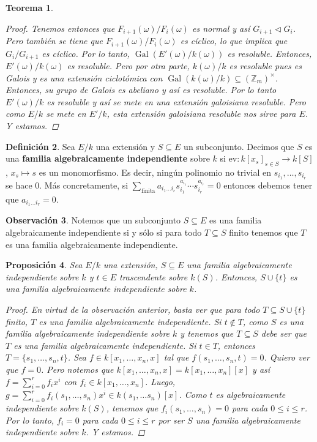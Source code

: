 \documentclass[12pt]{book}
\newtheorem{teo}{Teorema}[section]
\newtheorem{prop}[teo]{Proposición}
\theoremstyle{definition}
\newtheorem{obs}[teo]{Observación}
\newtheorem{defn}[teo]{Definición}
\newcommand{\ZZ}{\mathbb{Z}}      %
\DeclareMathOperator{\Gal}{Gal}
\begin{document}
\begin{teo}
\begin{proof}
Tenemos entonces que $F_{i+1}(\omega)/F_i(\omega)$ es normal y así $G_{i+1}\triangleleft G_i$. Pero también se tiene que $F_{i+1}(\omega)/F_i(\omega)$ es cíclico, lo que implica que $G_i/G_{i+1}$ es cíclico. Por lo tanto, $\Gal(E'(\omega)/k(\omega))$ es resoluble. Entonces, $E'(\omega)/k(\omega)$ es resoluble. Pero por otra parte, $k(\omega)/k$ es resoluble pues es Galois y es una extensión ciclotómica con $\Gal(k(\omega)/k)\subseteq (\ZZ_m)^\times$. Entonces, su grupo de Galois es abeliano y así es resoluble. Por lo tanto $E'(\omega)/k$ es resoluble y así se mete en una extensión galoisiana resoluble. Pero como $E/k$ se mete en $E'/k$, esta extensión galoisiana resoluble nos sirve para $E$. Y estamos.
\end{proof}
\end{teo}

\begin{defn}
Sea $E/k$ una extensión y $S\subseteq E$ un subconjunto. Decimos que $S$ es una \textbf{familia algebraicamente independiente} sobre $k$ si $\mathrm{ev}:k[x_s]_{s\in S}\to k[S]$, $x_s\mapsto s$ es un monomorfismo. Es decir, ningún polinomio no trivial en $s_{i_1},\ldots ,s_{i_r}$ se hace $0$. Más concretamente, si $\displaystyle\sum_{\text{finita}}a_{i_1\ldots i_r}s_{i_1}^{a_{i_1}}\cdots s_{i_r}^{a_{i_r}} = 0$ entonces debemos tener que $a_{i_1\ldots i_r}=0$.
\end{defn}

\begin{obs}
Notemos que un subconjunto $S\subseteq E$ es una familia algebraicamente independiente si y sólo si para todo $T\subseteq S$ finito tenemos que $T$ es una familia algebraicamente independiente.
\end{obs}

\begin{prop}
Sea $E/k$ una extensión, $S\subseteq E$ una familia algebraicamente independiente sobre $k$ y $t\in E$ trascendente sobre $k(S)$. Entonces, $S\cup\{t\}$ es una familia algebraicamente independiente sobre $k$.
\begin{proof}
En virtud de la observación anterior, basta ver que para todo $T\subseteq S\cup \{t\}$ finito, $T$ es una familia algebraicamente independiente. Si $t\notin T$, como $S$ es una familia algebraicamente independiente sobre $k$ y tenemos que $T\subseteq S$ debe ser que $T$ es una familia algebraicamente independiente. Si $t\in T$, entonces $T=\{s_1,\ldots , s_n,t\}$. Sea $f\in k[x_1,\ldots ,x_n,x]$ tal que $f(s_1,\ldots , s_n,t)=0$. Quiero ver que $f=0$. Pero notemos que $k[x_1,\ldots , x_n,x]=k[x_1,\ldots , x_n][x]$ y así $f=\displaystyle\sum_{i=0}^r f_ix^i$ con $f_i\in k[x_1,\ldots , x_n]$. Luego, $g = \displaystyle\sum_{i=0}^r f_i(s_1,\ldots , s_n) x^i\in k(s_1,\ldots s_n)[x]$. Como $t$ es algebraicamente independiente sobre $k(S)$, tenemos que $f_i(s_1,\ldots , s_n)=0$ para cada $0\leq i\leq r$. Por lo tanto, $f_i=0$ para cada $0\leq i\leq r$ por ser $S$ una familia algebraicamente independiente sobre $k$. Y estamos.
\end{proof}
\end{prop}
\end{document}
